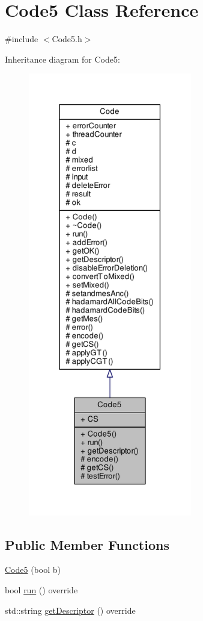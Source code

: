 \hypertarget{class_code5}{}\section{Code5 Class Reference}
\label{class_code5}


{\ttfamily \#include $<$Code5.\+h$>$}



Inheritance diagram for Code5\+:\nopagebreak
\begin{figure}[H]
\begin{center}
\leavevmode
\includegraphics[height=550pt]{class_code5__inherit__graph}
\end{center}
\end{figure}
\subsection*{Public Member Functions}
\begin{DoxyCompactItemize}
\item 
\hyperlink{class_code5_ae98c6fa8281984fdc2f78e7d989a8664}{Code5} (bool b)
\item 
bool \hyperlink{class_code5_ad2aec9994037880f38205e739a8f8a4a}{run} () override
\item 
std\+::string \hyperlink{class_code5_ab7cd6f3c172a4a0c45bc0fa41a3ff535}{get\+Descriptor} () override
\end{DoxyCompactItemize}
